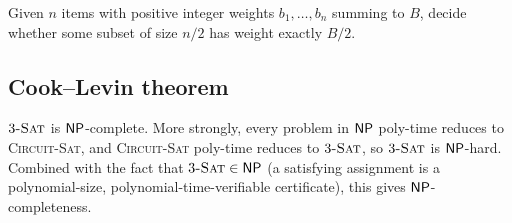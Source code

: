 \begin{definition}
\label{def:fantastic_half}
Given $n$ items with positive integer weights $b_1, \dots, b_n$ summing to $B$, decide whether some subset of size $n/2$ has weight exactly $B/2$.
\end{definition}

\subsection{Cook--Levin theorem}

\begin{theorem}
\label{thm:cook_levin}
$3\textsc{-Sat}$ is $\mathsf{NP}$-complete. More strongly, every problem in $\mathsf{NP}$ poly-time reduces to \textsc{Circuit-Sat}, and \textsc{Circuit-Sat} poly-time reduces to $3\textsc{-Sat}$, so $3\textsc{-Sat}$ is $\mathsf{NP}$-hard. Combined with the fact that $3\textsc{-Sat} \in \mathsf{NP}$ (a satisfying assignment is a polynomial-size, polynomial-time-verifiable certificate), this gives $\mathsf{NP}$-completeness.
\end{theorem}

